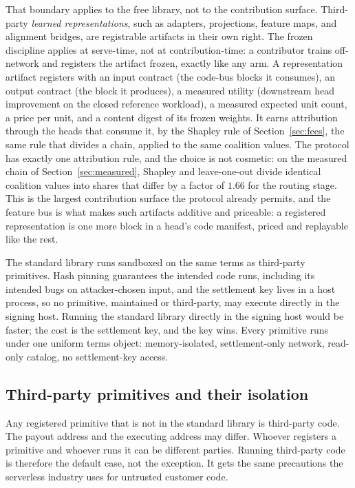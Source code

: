 \documentclass[11pt]{article}
\begin{document}
That boundary applies to the free library, not to the
contribution surface. Third-party \emph{learned representations}, such as
adapters, projections, feature maps, and alignment bridges, are
registrable artifacts in their own right. The frozen discipline
applies at serve-time, not at contribution-time: a contributor
trains off-network and registers the artifact frozen, exactly like
any arm. A representation artifact registers with an input
contract (the code-bus blocks it consumes), an output contract
(the block it produces), a measured utility (downstream head
improvement on the closed reference workload), a measured expected
unit count, a price per unit, and a content digest of its frozen
weights. It earns attribution through the heads that consume it,
by the Shapley rule of Section~\ref{sec:fees}, the same rule
that divides a chain, applied to the same coalition values. The
protocol has exactly one attribution rule, and the choice is not
cosmetic: on the measured chain of Section~\ref{sec:measured},
Shapley and leave-one-out divide identical coalition values into
shares that differ by a factor of $1.66$ for the routing stage.
This is the largest contribution
surface the
protocol already permits, and the feature bus is what makes such
artifacts additive and priceable: a registered representation is
one more block in a head's code manifest, priced and replayable
like the rest.

The standard library runs sandboxed on the same terms as
third-party primitives. Hash pinning guarantees the
intended code runs, including its intended bugs on
attacker-chosen input, and the settlement key lives in a host
process, so no primitive, maintained or third-party, may execute
directly in the signing host. Running the standard library
directly in the signing host would be faster; the cost is the
settlement key, and the key wins. Every primitive runs under one
uniform terms object: memory-isolated, settlement-only network,
read-only catalog, no settlement-key access.

\subsection{Third-party primitives and their isolation}

Any registered primitive that is not in the standard library is
third-party code. The payout address and the executing address may
differ. Whoever registers a primitive and whoever runs it can be
different parties. Running third-party code is therefore the
default case, not the exception. It gets the same precautions the
serverless industry uses for untrusted customer code.
\end{document}
